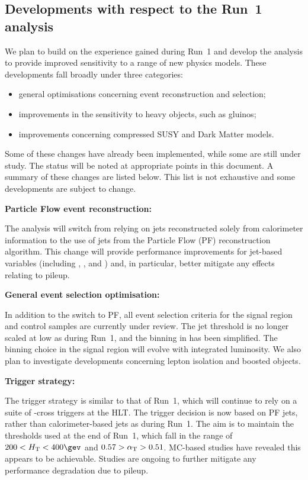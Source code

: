 \subsection{Developments with respect to the Run~1 analysis}
\label{sec:changes}

We plan to build on the experience gained during Run~1 and develop the
analysis to provide improved sensitivity to a range of new physics
models. These developments fall broadly under three categories:

\begin{itemize}
\item general optimisations concerning event reconstruction and
  selection;
\item improvements in the sensitivity to heavy objects, such as gluinos;
\item improvements concerning compressed SUSY and Dark Matter
  models. 
\end{itemize}

Some of these changes have already been implemented, while some are
still under study. The status will be noted at appropriate points in
this document. A summary of these changes are listed below. This list
is not exhaustive and some developments are subject to change.

{\bf Particle Flow event reconstruction:}

The analysis will switch from relying on jets reconstructed solely
from calorimeter information to the use of jets from the Particle Flow
(PF) reconstruction algorithm. This change will provide performance
improvements for jet-based variables (including \scalht, \mht, and
\alphat) and, in particular, better mitigate any effects relating to
pileup.

{\bf General event selection optimisation:}

In addition to the switch to PF, all event selection criteria for the
signal region and control samples are currently under review. The jet
\Pt threshold is no longer scaled at low \scalht as during Run~1, and
the binning in \scalht has been simplified. The binning choice in the
signal region will evolve with integrated luminosity.  We also plan to
investigate developments concerning lepton isolation and boosted
objects.

{\bf Trigger strategy:}

The trigger strategy is similar to that of Run~1, which will continue
to rely on a suite of \scalht-\alphat cross triggers at the HLT. The
trigger decision is now based on PF jets, rather than
calorimeter-based jets as during Run~1. The aim is to maintain the
thresholds used at the end of Run~1, which fall in the range of $200 <
\scalht < 400\gev$ and $0.57 > \alpha_{\text{T}} > 0.51$. MC-based studies have
revealed this appears to be achievable. Studies are ongoing to further
mitigate any performance degradation due to pileup.

